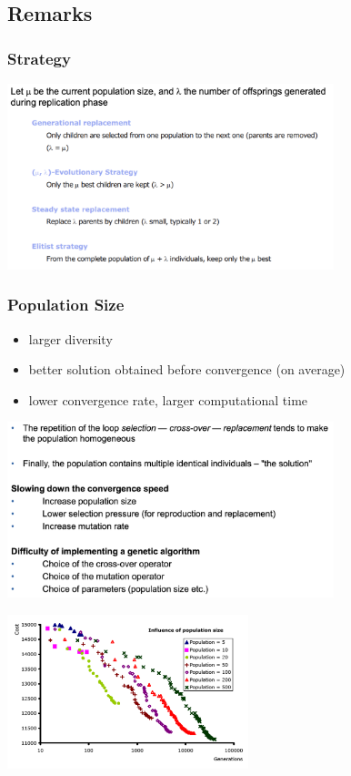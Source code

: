 \documentclass[10pt,a4paper,twocolumn]{article}
\newcommand\pro{\item[$+$]}
\begin{document}
\subsection{Remarks}
\subsubsection{Strategy}
\begin{center}
	\includegraphics[width=9.5cm]{images/strategies}
\end{center}

\subsubsection{Population Size}
\begin{itemize}
	\pro larger diversity
	\pro better solution obtained before convergence (on average)
	\pro lower convergence rate, larger computational time
\end{itemize}

\begin{center}
	\includegraphics[width=9.5cm]{images/populationsize}
\end{center}

\begin{center}
	\includegraphics[width=7cm]{images/influence_of_populationsize}
\end{center}
\end{document}
